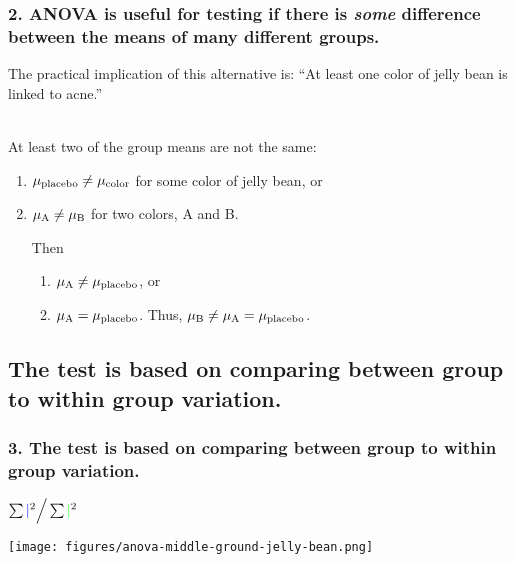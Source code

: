 \documentclass[11pt,containsverbatim,handout,xcolor=xelatex,dvipsnames,table]{beamer}
\newcommand{\mainideaB}{ANOVA is useful for testing if there is \emph{some} difference
  between the means of many different groups.}
\newcommand{\mainideaC}{The test is based on comparing between group to within group variation.}
\begin{document}

\begin{frame}
  \frametitle{2. \mainideaB}

The practical implication of this alternative is: ``At least one color of
jelly bean is linked to acne.''

\pause

\hfill \\

At least two of the group means are not the same: \pause
\begin{enumerate}
\item $\mu_{\textmd{placebo}} \neq \mu_{\textmd{color}}$ for some color of jelly
  bean, or \pause
\item $\mu_{\textmd{A}} \neq \mu_{\textmd{B}}$ for two colors, A and B. \pause

\vspace{6pt}

Then 

\vspace{3pt}

\begin{enumerate}
\item $\mu_{\textmd{A}} \neq \mu_{\textmd{placebo}}$, or \pause

\item $\mu_{\textmd{A}} = \mu_{\textmd{placebo}}$.  Thus, $\mu_{\textmd{B}} \neq
  \mu_{\textmd{A}} = \mu_{\textmd{placebo}}$.
\end{enumerate}

\end{enumerate}

\end{frame}


\subsection{\mainideaC}
\label{mi3}


\begin{frame}
  \frametitle{3. \mainideaC}

\centering
\(
\sum {\color{blue} \mid}^2 \Big/ \sum {\color{green} \mid}^2
\)

  \texttt{[image: figures/anova-middle-ground-jelly-bean.png]}

\end{frame}
\end{document}
